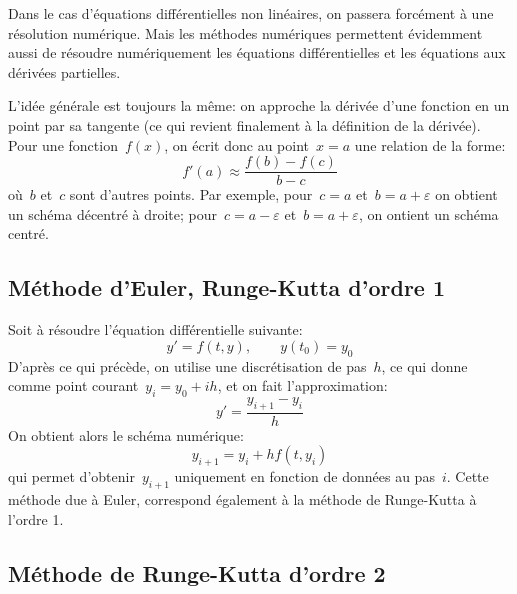 Dans le cas d'équations différentielles non linéaires, on passera forcément à une résolution numérique. Mais les méthodes numériques permettent évidemment aussi de résoudre numériquement les équations différentielles et les équations aux dérivées partielles.

L'idée générale est toujours la même: on approche la dérivée d'une fonction en un point par sa tangente (ce qui revient finalement à la définition de la dérivée). Pour une fonction~$f(x)$, on écrit donc au point~$x=a$ une relation de la forme:
\begin{equation}
f'(a)\approx \frac{f(b)-f(c)}{b-c}
\end{equation}
où~$b$ et~$c$ sont d'autres points. Par exemple, pour~$c=a$ et~$b=a+\varepsilon$ on obtient un schéma décentré à droite; pour~$c=a-\varepsilon$ et~$b=a+\varepsilon$, on ontient un schéma centré.
 
\medskip
\subsection{Méthode d'Euler, Runge-Kutta d'ordre 1} 

Soit à résoudre l'équation différentielle suivante:
\begin{equation}
y' = f(t, y), \qquad y(t_0) = y_0
\end{equation}
D'après ce qui précède, on utilise une discrétisation de pas~$h$, ce qui donne comme point courant~$y_i=y_0+ih$, et on fait l'approximation:
\begin{equation} 
y'=\frac{y_{i+1}-y_i}h
\end{equation}
On obtient alors le schéma numérique:
\begin{equation}
y_{i+1}=y_i+hf(t,y_i)
\end{equation}
qui permet d'obtenir~$y_{i+1}$ uniquement en fonction de données au pas~$i$. Cette méthode due à Euler, correspond également à la méthode de Runge-Kutta à l'ordre 1. 
 
\medskip
\subsection{Méthode de Runge-Kutta d'ordre 2} 


